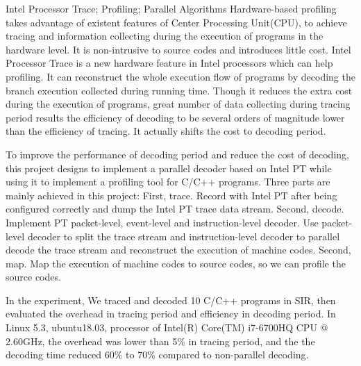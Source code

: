 \begin{enabstract}{Intel Processor Trace; Profiling; Parallel Algorithms}
  Hardware-based profiling takes advantage of existent features of Center Processing Unit(CPU), to achieve tracing and information collecting during the execution of programs in the hardware level. It is non-intrusive to source codes and introduces little cost. Intel Processor Trace is a new hardware feature in Intel processors which can help profiling. It can reconstruct the whole execution flow of programs by decoding the branch execution collected during running time. Though it reduces the extra cost during the execution of programs, great number of data collecting during tracing period results the efficiency of decoding to be several orders of magnitude lower than the efficiency of tracing. It actually shifts the cost to decoding period.

  To improve the performance of decoding period and reduce the cost of decoding, this project designs to implement a parallel decoder based on Intel PT while using it to implement a profiling tool for C/C++ programs. Three parts are mainly achieved in this project: First, trace. Record with Intel PT after being configured correctly and dump the Intel PT trace data stream. Second, decode. Implement PT packet-level, event-level and instruction-level decoder. Use packet-level decoder to split the trace stream and instruction-level decoder to parallel decode the trace stream and reconstruct the execution of machine codes. Second, map. Map the execution of machine codes to source codes, so we can profile the source codes.

  In the experiment, We traced and decoded 10 C/C++ programs in SIR, then evaluated the overhead in tracing period and efficiency in decoding period. In Linux 5.3, ubuntu18.03, processor of Intel(R) Core(TM) i7-6700HQ CPU @ 2.60GHz, the overhead was lower than 5\% in tracing period, and the the decoding time reduced 60\% to 70\% compared to non-parallel decoding.
\end{enabstract}